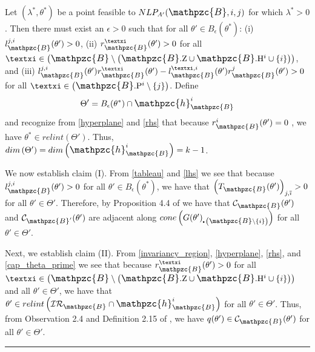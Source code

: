 \documentclass[11pt]{article}
\newenvironment{proof}{{\bf Proof:}}{\hfill\rule{2mm}{2mm}}
\newcommand{\bul}{\scalebox{.45}{\ensuremath{\bullet}}}
\newcommand{\B}{\mathbin{\ThisStyle{\scalebox{1.15}{$\SavedStyle\ensuremath{\mathpzc{B}}$}}}}
\newcommand{\hy}{\scalebox{1.15}{\ensuremath{\mathpzc{h}}}}
\newcommand{\C}{\mathrm{Z}}
\newcommand{\Hh}{\mathrm{H}}
\newcommand\thickbar[1]{\accentset{\rule{.4em}{.8pt}}{#1}}
\newcommand{\icomp}{\thickbar{{\large \vphantom{a}} \imath}}
\newcommand{\xii}{\text{\textxi}}
\newcommand{\IR}{\mathcal{IR}}
\newcommand{\compcone}[2]{\mathcal{C}_{#1}(#2)}
\newcommand{\identZero}[1]{#1.\C}
\newcommand{\contains}[2]{#1.\Hh^{#2}}
\newcommand{\invRgn}[1]{\IR_{#1}}
\newcommand{\constraint}[3]{r_{#1}^{#2}(#3)}
\newcommand{\tableauEl}[4]{\left(T_{#1}(#2)\right)_{#3,#4}}
\renewcommand{\P}{\mathrm{P}}
\newcommand{\nonnegCol}[2]{#1.\P^{#2}}
\renewcommand{\complement}[1]{\overline{#1}}
\newcommand{\hypersurface}[2]{\hy_{#1}^{#2}}
\renewcommand{\icomp}{\complement{\imath}}
\newcommand{\lhs}[4]{l_{#1}^{#2,#3}(#4)}
\newcommand{\ball}[2]{B_{#1}(#2)}
\begin{document}
\begin{enumerate}
\begin{proof}
Let $(\lambda^*,\theta^*)$ be a point feasible to $NLP_{A'}(\B,i,j)$ for which $\lambda^* > 0$. Then there must exist an $\epsilon > 0$ such that for all $\theta' \in B_\epsilon(\theta^*)$: (i) $\lhs{\B}{j}{i}{\theta'} > 0$, (ii) $\constraint{\B}{\xii}{\theta'} > 0$ for all $\xii\in\left(\B\setminus\left(\identZero{\B}\cup \contains{\B}{i} \cup \{i\}\right)\right)$, and (iii) $\lhs{\B}{j}{i}{\theta'}\constraint{\B}{\xii}{\theta'} - \lhs{\B}{\xii}{i}{\theta'}\constraint{\B}{j}{\theta'} > 0$ for all $\xii\in\left(\nonnegCol{\B}{i} \setminus \{j\}\right)$. Define
\begin{equation}\label{cap_theta_prime}
\Theta' = \ball{\epsilon}{\theta^*} \cap \hypersurface{\B}{i}
\end{equation}
and recognize from \eqref{hyperplane} and \eqref{rhs} that because $\constraint{\B}{i}{\theta'} = 0$ , we have $\theta^* \in relint\left(\Theta'\right)$. Thus, $dim\left(\Theta'\right) = dim\left(\hypersurface{\B}{i}\right) = k - 1$.

We now establish claim (I). From \eqref{tableau} and \eqref{lhs} we see that because $\lhs{\B}{j}{i}{\theta'} > 0$ for all $\theta' \in B_\epsilon(\theta^*)$, we have that $\tableauEl{\B}{\theta'}{j}{\icomp} > 0$ for all $\theta' \in \Theta'$. Therefore, by Proposition 4.4 of \citep{adelgren2021advancing} we have that $\compcone{\B}{\theta'}$ and $\compcone{\B'}{\theta'}$ are adjacent along $cone\left(G(\theta')_{\bul\, \left(\B\setminus\{i\}\right)} \right)$ for all $\theta' \in \Theta'$.

Next, we establish claim (II). From \eqref{invariancy_region}, \eqref{hyperplane}, \eqref{rhs}, and \eqref{cap_theta_prime} we see that because $\constraint{\B}{\xii}{\theta'} > 0$ for all $\xii\in\left(\B\setminus\left(\identZero{\B}\cup \contains{\B}{i} \cup \{i\}\right)\right)$ and all $\theta' \in \Theta'$, we have that 
$\theta' \in relint\left(\invRgn{\B} \cap \hypersurface{\B}{i}\right)$ for all $\theta' \in \Theta'$. Thus, from Observation 2.4 and Definition 2.15 of \citep{adelgren2021advancing}, we have $q(\theta') \in \compcone{\B}{\theta'}$ for all $\theta' \in \Theta'$. 


\end{proof}
\end{enumerate}
\end{document}

